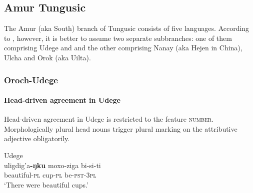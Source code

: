 \subsection{Amur Tungusic}
The Amur (aka South) branch of Tungusic consists of five languages. According to \citet[223]{salminen2007}, however, it is better to assume two separate subbranches: one of them comprising Udege and  and the other comprising Nanay (aka Hejen in China), Ulcha and Orok (aka Uilta).

\subsubsection{Oroch-Udege}
\paragraph*{Head\hyp{}driven agreement in Udege}
Head\hyp{}driven agreement in Udege is restricted to the feature \textsc{number}. Morphologically plural head nouns trigger plural marking on the attributive adjective obligatorily.
\begin{exe}
\ex 
\rm{Udege \citep[468]{nikolaeva-etal2001}}\\
\gll	uligdig'a\textbf{-ŋku} moxo-ziga bi-si-ti\\
	beautiful\textsc{-pl} cup\textsc{-pl} be\textsc{-pst-3pl}\\
\glt	‘There were beautiful cups.’
\end{exe}

